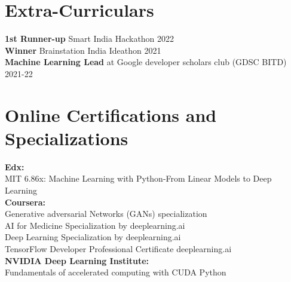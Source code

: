 \documentclass[letterpaper,11pt]{article}
\newcommand{\resumeSubHeadingListStart}{\begin{itemize}[leftmargin=0.15in, label={}]}
\newcommand{\resumeSubHeadingListEnd}{\end{itemize}}
\begin{document}
\section{Extra-Curriculars}
  \vspace{1pt}
  \resumeSubHeadingListStart
    \small{\item{
		    \textbf{1st Runner-up}{ Smart India Hackathon 2022}\\ \vspace{2pt}
		    \textbf{Winner}{ Brainstation India Ideathon 2021 } \\ \vspace{2pt}
		    \textbf{Machine Learning Lead}{ at Google developer scholars club (GDSC BITD) 2021-22} 
                }

        }
  \resumeSubHeadingListEnd






\section{Online Certifications and Specializations}
  \vspace{1pt}
  \resumeSubHeadingListStart
    \small{\item{
		    \textbf{Edx:\\}{MIT 6.86x: Machine Learning with Python-From Linear Models to Deep Learning}
		\textbf{\vspace{2pt}\\Coursera:\\}{Generative adversarial Networks (GANs) specialization\\AI for Medicine Specialization by deeplearning.ai\\Deep Learning Specialization by deeplearning.ai\\TensorFlow Developer Professional Certificate deeplearning.ai}
		\textbf{\vspace{2pt}\\NVIDIA Deep Learning Institute:\\}{Fundamentals of accelerated computing with CUDA Python}


                }
        }
  \resumeSubHeadingListEnd
\end{document}
